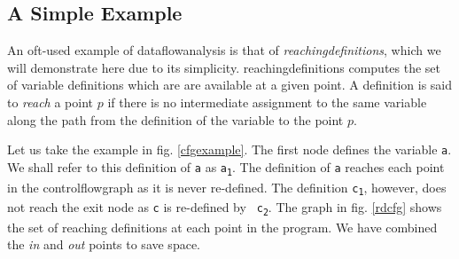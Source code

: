 \documentclass[bsc,twoside,singlespacing,parskip,logo,notimes,normalheadings]{infthesis}
\begin{document}
	\subsection{A Simple Example}
	An oft-used example of \gls{dataflowanalysis} is that of {\em
          \gls{reachingdefinition}s}, which we will demonstrate here due to
        its simplicity. \Gls{reachingdefinition}s computes the set of
        variable definitions which are are available at a given
        point. A definition is said to {\em reach} a point $p$ if
        there is no intermediate assignment to the same variable along
        the path from the definition of the variable to the point $p$.
        
        Let us take the example in fig. \ref{cfgexample}. The first
        node defines the variable {\tt a}. We shall refer to this
        definition of {\tt a} as {\tt a\textsubscript{1}}. The
        definition of {\tt a} reaches each point in the
        \gls{controlflowgraph} as it is never re-defined. The
        definition {\tt c\textsubscript{1}}, however, does not reach
        the exit node as {\tt c} is re-defined by {\tt
          c\textsubscript{2}}. The graph in fig. \ref{rdcfg} shows the
        set of reaching definitions at each point in the program. We
        have combined the {\em in} and {\em out} points to save space.
        
\end{document}
